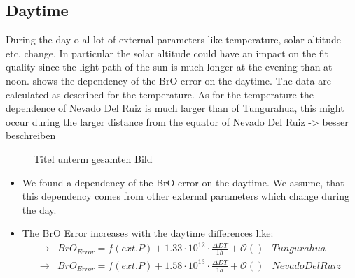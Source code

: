 \documentclass  [
  paper    = a4,
  BCOR     = 10mm,
  twoside,
  fontsize = 12pt,
  fleqn,
  toc      = bibnumbered,
  toc      = listofnumbered,
  numbers  = noendperiod,
  headings = normal,
  listof   = leveldown,
  version  = 3.03
]                                       {scrreprt}
\begin{document}
	\subsection{Daytime}
	During the day o al lot of external parameters like temperature, solar altitude etc. change. In particular the solar altitude could have an impact on the fit quality since the light path of the sun is much longer at the evening than at noon.  shows the dependency of the BrO error on the daytime. The data are calculated as described for the temperature. As for the temperature the dependence of Nevado Del Ruiz is much larger than of Tungurahua, this might occur during the larger distance from the equator of Nevado Del Ruiz -> besser beschreiben
	\begin{figure}[h!]			
		\caption{Titel unterm gesamten Bild}
		\label{fig:diffdaytime}
	\end{figure}
	\begin{itemize}
		\item We found a dependency of the BrO error on the daytime. We assume, that this dependency comes from other external parameters which change during the day. 
		\item The BrO Error increases with the daytime differences like: \\
		\begin{align*}
		\rightarrow&  BrO_{Error} = f(ext. P)+1.33\cdot10^{12}\cdot\frac{\Delta DT}{1h}  + \mathcal{O}\left(\right)& Tungurahua\\
		\rightarrow&  BrO_{Error} = f(ext. P)+1.58\cdot10^{13}\cdot\frac{\Delta DT}{1h} + \mathcal{O}\left(\right) & Nevado Del Ruiz\\
		\end{align*}
		
	\end{itemize}
\end{document}

